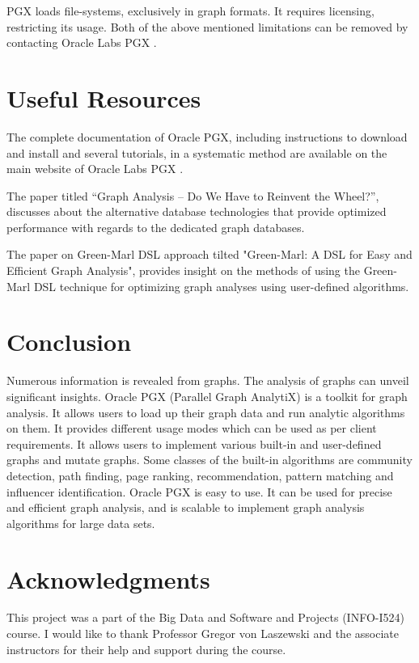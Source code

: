 \documentclass[9pt,twocolumn,twoside]{../../styles/osajnl}
\begin{document}
PGX loads file-systems, exclusively in graph formats. It requires
licensing, restricting its usage. Both of the above mentioned
limitations can be removed by contacting Oracle Labs PGX
\cite{www-limit}.

\section{Useful Resources}
The complete documentation of Oracle PGX, including instructions to
download and install and several tutorials, in a systematic method are
available on the main website of Oracle Labs PGX \cite{www-wel}.

The paper titled “Graph Analysis – Do We Have to Reinvent the Wheel?”,
discusses about the alternative database technologies that provide
optimized performance with regards to the dedicated graph
databases. \cite{welc2013graph}

The paper on Green-Marl DSL approach tilted "Green-Marl: A DSL for
Easy and Efficient Graph Analysis", provides insight on the methods of
using the Green-Marl DSL technique for optimizing graph analyses using
user-defined algorithms. \cite{hong2012green}

\section{Conclusion}
Numerous information is revealed from graphs. The analysis of graphs
can unveil significant insights. Oracle PGX (Parallel Graph AnalytiX)
is a toolkit for graph analysis. It allows users to load up their
graph data and run analytic algorithms on them. It provides different
usage modes which can be used as per client requirements. It allows
users to implement various built-in and user-defined graphs and mutate
graphs. Some classes of the built-in algorithms are community
detection, path finding, page ranking, recommendation, pattern
matching and influencer identification. Oracle PGX is easy to use. It
can be used for precise and efficient graph analysis, and is scalable
to implement graph analysis algorithms for large data sets.

\section{Acknowledgments}
This project was a part of the Big Data and Software and Projects
(INFO-I524) course. I would like to thank Professor Gregor von
Laszewski and the associate instructors for their help and support
during the course.


\end{document}
